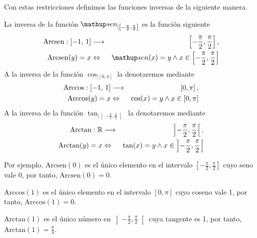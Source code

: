 Con estas restricciones definimos las funciones inversas de la siguiente manera.

\begin{defn}		
La inversa de la funci\'on $\sen_{|\left[-\frac{\pi}{2},\frac{\pi}{2}\right]}$ es la función siguiente
\begin{eqnarray*}
	\mbox{Arcsen}: [-1,\,1] &\To& \left[-\frac{\pi}{2},\frac{\pi}{2}\right],\\
	\mbox{Arcsen}(y) = x &\gdw& \sen(x) = y\wedge x \in \left[-\frac{\pi}{2},\frac{\pi}{2}\right]
\end{eqnarray*}
A la inversa de la funci\'on $\cos_{|\left[0,\pi\right]}$ la denotaremos mediante
\begin{eqnarray*}
	\mbox{Arccos}: [-1,\,1] &\longrightarrow& \left[0,\pi\right],\\
	\mbox{Arccos}(y) = x &\Leftrightarrow&\cos(x) = y\wedge x \in \left[0,\pi\right]
\end{eqnarray*}
A la inversa de la funci\'on $\tan_{|\left]-\frac{\pi}{2},\frac{\pi}{2}\right[}$ la denotaremos mediante
\begin{eqnarray*}
	\mbox{Arctan}: \mathbb{R} &\longrightarrow& \left]-\frac{\pi}{2},\frac{\pi}{2}\right[,\\
	\mbox{Arctan}(y) = x &\Leftrightarrow& \tan(x) = y\wedge x \in \left]-\frac{\pi}{2},\frac{\pi}{2}\right[
\end{eqnarray*}
\end{defn}

Por ejemplo, $\mbox{Arcsen}(0)$ es el \'unico elemento en el intervalo
		$\left[-\frac{\pi}{2},\frac{\pi}{2}\right]$ cuyo seno vale 0, por tanto, $\mbox{Arcsen}(0) = 0$.
		
$\mbox{Arccos}(1)$ es el \'unico elemento en el intervalo $\left[0,\pi\right]$ cuyo coseno vale 1, por tanto, $\mbox{Arccos}(1) = 0$.
		
$\mbox{Arctan}(1)$ es el \'unico n\'umero en $\left]-\frac{\pi}{2},\frac{\pi}{2}\right[$ cuya
		tangente es 1, por tanto, $\mbox{Arctan}(1) = \frac{\pi}{4}$.
		
